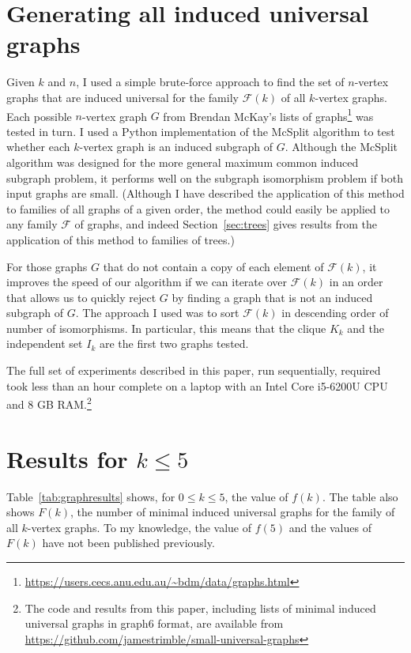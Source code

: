 \documentclass[12pt]{article}
\newcommand{\calF}{\ensuremath{\mathcal{F}}}
\begin{document}
\section{Generating all induced universal graphs}\label{sec:method}

Given $k$ and $n$,
I used a simple brute-force approach to find the set of
$n$-vertex graphs that are induced universal for the family $\calF(k)$ of all $k$-vertex
graphs.  Each possible $n$-vertex graph $G$ from Brendan McKay's lists of
graphs\footnote{\url{https://users.cecs.anu.edu.au/~bdm/data/graphs.html}} was
tested in turn.  I used a Python implementation of the McSplit
algorithm \cite{DBLP:conf/ijcai/McCreeshPT17} to test whether each $k$-vertex
graph is an induced subgraph of $G$.  Although the McSplit algorithm was designed for
the more general maximum common induced subgraph problem, it performs well on
the subgraph isomorphism problem if both input graphs are small.  (Although
I have described the application of this method to families of all graphs of a given order,
the method could easily be applied to any family $\calF$ of graphs, and indeed
Section~\ref{sec:trees} gives results from the application of this method
to families of trees.)

For those graphs $G$ that do not contain a copy of each element of $\calF(k)$,
it improves the speed of our algorithm if we can iterate over
$\calF(k)$ in an order that allows us to quickly reject $G$ by finding a graph
that is not an induced subgraph of $G$.  The approach I used was to sort
$\calF(k)$ in descending order of number of isomorphisms.  In particular, this
means that the clique $K_k$ and the independent set $I_k$ are the first two
graphs tested.

The full set of experiments described in this paper, run sequentially, required
took less than an hour complete on a laptop with an Intel Core i5-6200U CPU
and 8 GB RAM.\footnote{The code and
results from this paper, including lists of minimal induced universal graphs
in graph6 format, are available from
\url{https://github.com/jamestrimble/small-universal-graphs}}

\section{Results for \texorpdfstring{$k \leq 5$}{k<=5}}\label{sec:results5}

Table~\ref{tab:graphresults} shows, for $0 \leq k \leq 5$, the value of $f(k)$.
The table also shows $F(k)$, the number of minimal induced universal
graphs for the family of all $k$-vertex graphs.  To my knowledge, the value of
$f(5)$ and the values of $F(k)$ have not been published previously.
\end{document}
